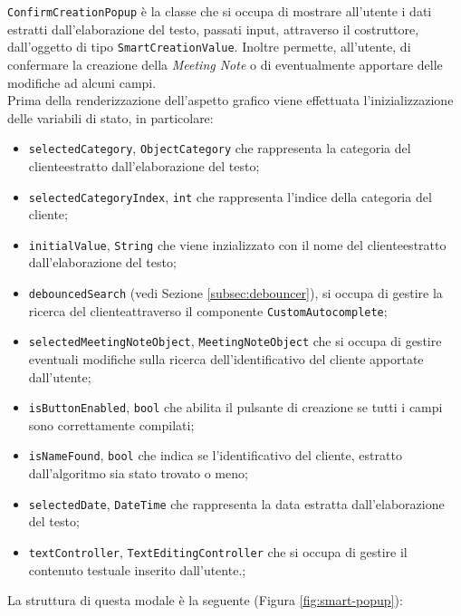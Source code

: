 \lstinline{ConfirmCreationPopup} è la classe che si occupa di mostrare all'utente i dati estratti dall'elaborazione del testo, passati input, attraverso il costruttore, dall'oggetto di tipo \lstinline{SmartCreationValue}.
Inoltre permette, all'utente, di confermare la creazione della \emph{Meeting Note} o di eventualmente apportare delle modifiche ad alcuni campi. \\
Prima della renderizzazione dell'aspetto grafico viene effettuata l'inizializzazione delle variabili di stato, in particolare:
\begin{itemize}
    \item \lstinline{selectedCategory}, \lstinline{ObjectCategory} che rappresenta la categoria del \gls{cliente}\glsoccur estratto dall'elaborazione del testo;
    \item \lstinline{selectedCategoryIndex}, \lstinline{int} che rappresenta l'indice della categoria del \gls{cliente}\glsoccur;
    \item \lstinline{initialValue}, \lstinline{String} che viene inzializzato con il nome del \gls{cliente}\glsoccur estratto dall'elaborazione del testo;
    \item \lstinline{debouncedSearch} (vedi Sezione \ref{subsec:debouncer}), si occupa di gestire la ricerca del \gls{cliente}\glsoccur attraverso il componente \lstinline{CustomAutocomplete};
    \item \lstinline{selectedMeetingNoteObject}, \lstinline{MeetingNoteObject} che si occupa di gestire eventuali modifiche sulla ricerca dell'identificativo del cliente apportate dall'utente;
    \item \lstinline{isButtonEnabled}, \lstinline{bool} che abilita il pulsante di creazione se tutti i campi sono correttamente compilati;
    \item \lstinline{isNameFound}, \lstinline{bool} che indica se l'identificativo del \gls{cliente}\glsoccur, estratto dall'algoritmo sia stato trovato o meno;
    \item \lstinline{selectedDate}, \lstinline{DateTime} che rappresenta la data estratta dall'elaborazione del testo;
    \item \lstinline{textController}, \lstinline{TextEditingController} che si occupa di gestire il contenuto testuale inserito dall'utente.;
\end{itemize}
La struttura di questa modale è la seguente (Figura \ref{fig:smart-popup}):
